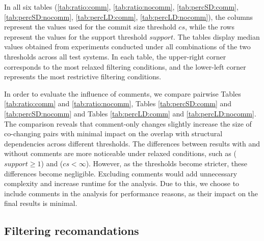In all six tables (\ref{tab:ratio:comm}, \ref{tab:ratio:nocomm}, \ref{tab:percSD:comm}, \ref{tab:percSD:nocomm}, \ref{tab:percLD:comm}, \ref{tab:percLD:nocomm}), the columns represent the values used for the commit size threshold $cs$, while the rows represent the values for the support threshold $support$. The tables display median values obtained from experiments conducted under all combinations of the two thresholds across all test systems. In each table, the upper-right corner corresponds to the most relaxed filtering conditions, and the lower-left corner represents the most restrictive filtering conditions.

In order to evaluate the influence of comments, we compare pairwise Tables \ref{tab:ratio:comm} and \ref{tab:ratio:nocomm}, Tables \ref{tab:percSD:comm} and \ref{tab:percSD:nocomm} and Tables \ref{tab:percLD:comm} and \ref{tab:percLD:nocomm}. 
The comparison reveals that comment-only changes slightly increase the size of co-changing pairs with minimal impact on the overlap with structural dependencies across different thresholds. The differences between results with and without comments are more noticeable under relaxed conditions, such as ($support \geq 1$) and ($cs < \infty$). However, as the thresholds become stricter, these differences become negligible.
Excluding comments would add unnecessary complexity and increase runtime for the analysis. Due to this, we choose to include comments in the analysis for performance reasons, as their impact on the final results is minimal.



\subsection{Filtering recomandations}
\label{filtering_recomandations}

\noindent
{}

